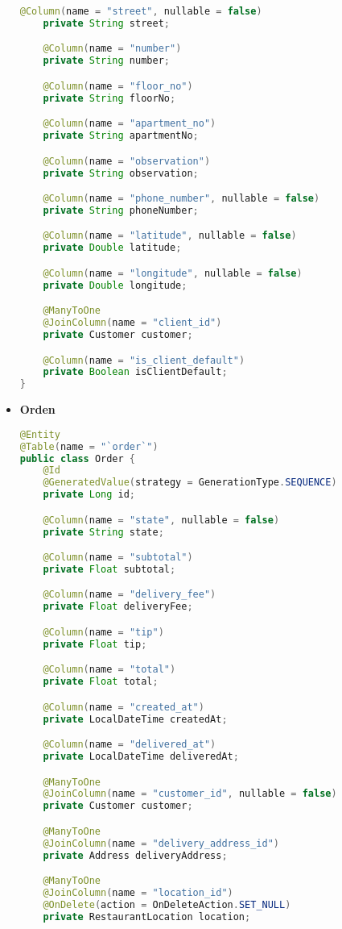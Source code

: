 \begin{itemize}
\begin{lstlisting}[style=common, language=Java]
    @Column(name = "street", nullable = false)
    private String street;

    @Column(name = "number")
    private String number;

    @Column(name = "floor_no")
    private String floorNo;

    @Column(name = "apartment_no")
    private String apartmentNo;

    @Column(name = "observation")
    private String observation;

    @Column(name = "phone_number", nullable = false)
    private String phoneNumber;

    @Column(name = "latitude", nullable = false)
    private Double latitude;

    @Column(name = "longitude", nullable = false)
    private Double longitude;

    @ManyToOne
    @JoinColumn(name = "client_id")
    private Customer customer;

    @Column(name = "is_client_default")
    private Boolean isClientDefault;
}
\end{lstlisting}


\item \textbf{Orden}

\begin{lstlisting}[style=common, language=Java]
@Entity
@Table(name = "`order`")
public class Order {
    @Id
    @GeneratedValue(strategy = GenerationType.SEQUENCE)
    private Long id;

    @Column(name = "state", nullable = false)
    private String state;

    @Column(name = "subtotal")
    private Float subtotal;

    @Column(name = "delivery_fee")
    private Float deliveryFee;

    @Column(name = "tip")
    private Float tip;

    @Column(name = "total")
    private Float total;

    @Column(name = "created_at")
    private LocalDateTime createdAt;

    @Column(name = "delivered_at")
    private LocalDateTime deliveredAt;

    @ManyToOne
    @JoinColumn(name = "customer_id", nullable = false)
    private Customer customer;

    @ManyToOne
    @JoinColumn(name = "delivery_address_id")
    private Address deliveryAddress;

    @ManyToOne
    @JoinColumn(name = "location_id")
    @OnDelete(action = OnDeleteAction.SET_NULL)
    private RestaurantLocation location;


\end{lstlisting}
\end{itemize}
